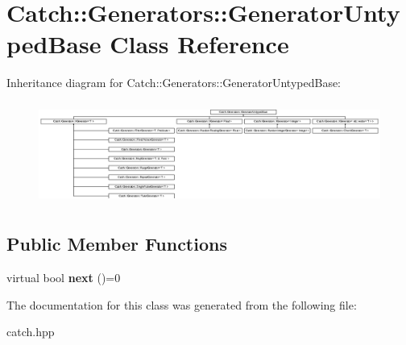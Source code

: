 \hypertarget{classCatch_1_1Generators_1_1GeneratorUntypedBase}{}\section{Catch\+::Generators\+::Generator\+Untyped\+Base Class Reference}
\label{classCatch_1_1Generators_1_1GeneratorUntypedBase}
Inheritance diagram for Catch\+::Generators\+::Generator\+Untyped\+Base\+:\begin{figure}[H]
\begin{center}
\leavevmode
\includegraphics[height=3.373494cm]{classCatch_1_1Generators_1_1GeneratorUntypedBase}
\end{center}
\end{figure}
\subsection*{Public Member Functions}
\begin{DoxyCompactItemize}
\item 
\mbox{\label{classCatch_1_1Generators_1_1GeneratorUntypedBase_aeed3c0cd6233c5f553549e453b8d6638}} 
virtual bool {\bfseries next} ()=0
\end{DoxyCompactItemize}


The documentation for this class was generated from the following file\+:\begin{DoxyCompactItemize}
\item 
catch.\+hpp\end{DoxyCompactItemize}
